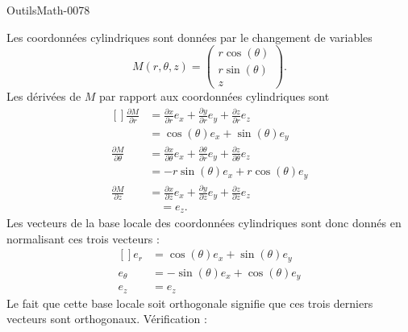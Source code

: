 
\begin{corrige}{OutilsMath-0078}

    Les coordonnées cylindriques sont données par le changement de variables
    \begin{equation}
        M(r,\theta,z)=\begin{pmatrix}
            r\cos(\theta)    \\ 
            r\sin(\theta)    \\ 
            z    
        \end{pmatrix}.
    \end{equation}
    Les dérivées de $M$ par rapport aux coordonnées cylindriques sont
    \begin{equation}
        \begin{aligned}[]
            \frac{ \partial M }{ \partial r }&=\frac{ \partial x }{ \partial r }e_x+\frac{ \partial y }{ \partial r }e_y+\frac{ \partial z }{ \partial r }e_z\\
            &=\cos(\theta)e_x+\sin(\theta)e_y\\
            \frac{ \partial M }{ \partial \theta }&=\frac{ \partial x }{ \partial \theta }e_x+\frac{ \partial \theta }{ \partial r }e_y+\frac{ \partial z }{ \partial \theta }e_z\\
            &=-r\sin(\theta)e_x+r\cos(\theta)e_y\\
            \frac{ \partial M }{ \partial z }&=\frac{ \partial x }{ \partial z }e_x+\frac{ \partial y }{ \partial z }e_y+\frac{ \partial z }{ \partial z }e_z\\
            &\quad=e_z.
        \end{aligned}
    \end{equation}
    Les vecteurs de la base locale des coordonnées cylindriques sont donc donnés en normalisant ces trois vecteurs :
    \begin{equation}
        \begin{aligned}[]
            e_r&=\cos(\theta)e_x+\sin(\theta)e_y\\          
            e_{\theta}&=-\sin(\theta)e_x+\cos(\theta)e_y\\          
            e_z&=e_z
        \end{aligned}
    \end{equation}
    Le fait que cette base locale soit orthogonale signifie que ces trois derniers vecteurs sont orthogonaux. Vérification :

\end{corrige}
